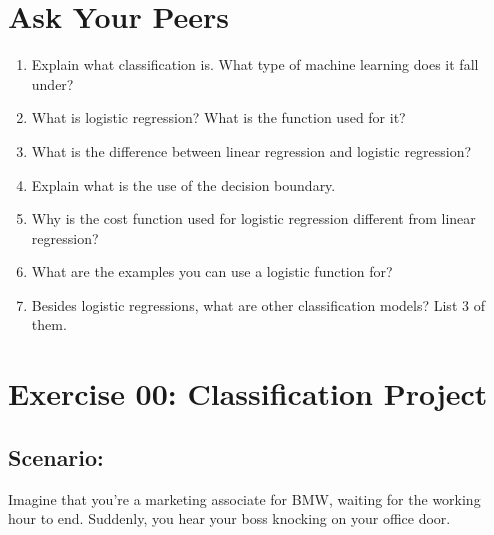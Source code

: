 \documentclass{42-en}
\begin{document}
\chapter{Ask Your Peers}

\begin{enumerate}
    \item Explain what classification is. What type of machine learning does it fall under?
    \item What is logistic regression? What is the function used for it?
    \item What is the difference between linear regression and logistic regression?
    \item Explain what is the use of the decision boundary.
    \item Why is the cost function used for logistic regression different from linear regression?
    \item What are the examples you can use a logistic function for?
    \item Besides logistic regressions, what are other classification models? List 3 of them.
\end{enumerate}

\startexercices



\chapter{Exercise 00: Classification Project}
\makeheaderfiles

\section*{Scenario:}
Imagine that you’re a marketing associate for BMW, waiting for the working hour to end. Suddenly, you hear your boss knocking on your office door.\\
\end{document}
